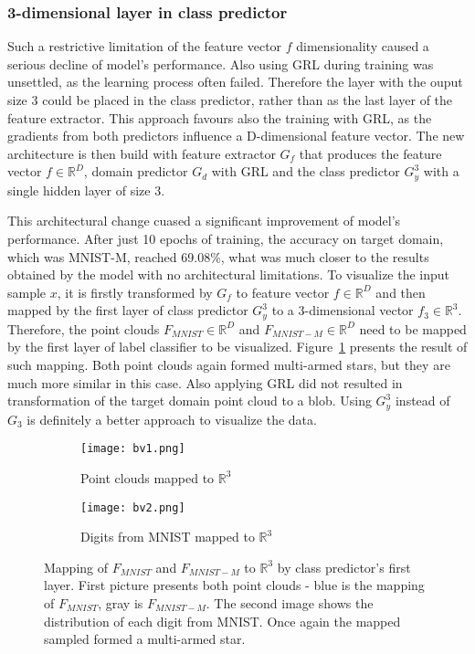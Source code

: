 \documentclass{article}
\begin{document}
\subsubsection{3-dimensional layer in class predictor}
Such a restrictive limitation of the feature vector $f$ dimensionality caused a serious decline of model's performance. Also using GRL during training was unsettled, as the learning process often failed. Therefore the layer with the ouput size 3 could be placed in the class predictor, rather than as the last layer of the feature extractor. This approach favours also the training with GRL, as the gradients from both predictors influence a D-dimensional feature vector. The new architecture is then build with feature extractor $G_{f}$ that produces the feature vector $f \in \mathbb{R}^{D}$, domain predictor $G_{d}$ with GRL and the class predictor $G_{y}^{3}$ with a single hidden layer of size 3. 
\par
This architectural change cuased a significant improvement of model's performance. After just 10 epochs of training, the accuracy on target domain, which was MNIST-M, reached 69.08\%, what was much closer to the results obtained by the model with no architectural limitations. To visualize the input sample $x$, it is firstly transformed by $G_{f}$ to feature vector $f \in \mathbb{R}^{D}$ and then mapped by the first layer of class predictor $G_{y}^{3}$ to a 3-dimensional vector $f_{3} \in \mathbb{R}^{3}$. Therefore, the point clouds $F_{MNIST} \in \mathbb{R}^{D}$ and $F_{MNIST-M} \in \mathbb{R}^{D}$ need to be mapped by the first layer of label classifier to be visualized. Figure~\ref{fig:vis_class_pred} presents the result of such mapping. Both point clouds again formed multi-armed stars, but they are much more similar in this case. Also applying GRL did not resulted in transformation of the target domain point cloud to a blob. Using $G_{y}^{3}$ instead of $G_{3}$ is definitely a better approach to visualize the data.
\begin{figure}[htb]%
    \centering
    \begin{subfigure}[b]{0.48\textwidth}
        \texttt{[image: bv1.png]}
        \caption{Point clouds mapped to $\mathbb{R}^{3}$}
    \end{subfigure}%
    \begin{subfigure}[b]{0.48\textwidth}
        \texttt{[image: bv2.png]}
        \caption{Digits from MNIST mapped to $\mathbb{R}^{3}$}
    \end{subfigure}%
    \caption{Mapping of $F_{MNIST}$ and $F_{MNIST-M}$ to $\mathbb{R}^{3}$ by class predictor's first layer. First picture presents both point clouds - blue is the mapping of $F_{MNIST}$, gray is $F_{MNIST-M}$. The second image shows the distribution of each digit from MNIST. Once again the mapped sampled formed a multi-armed star.}%
    \label{fig:vis_class_pred}%
\end{figure}
\end{document}
